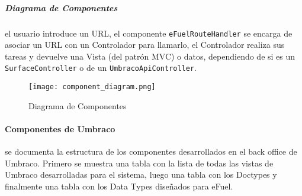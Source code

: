 \subparagraph*{Diagrama de Componentes} el usuario introduce un URL, el componente \texttt{eFuel\-RouteHandler} se encarga de asociar un URL con un Controlador para llamarlo, el Controlador realiza sus tareas y devuelve una Vista (del patrón MVC) o datos, dependiendo de si es un \texttt{SurfaceController} o de un \texttt{UmbracoApiController}.

\begin{figure}[H]
    \texttt{[image: component\_diagram.png]}
    \caption{Diagrama de Componentes}
    \label{fig:component_diagram}
    \centering
\end{figure}

\paragraph{Componentes de Umbraco} se documenta la estructura de los componentes desarrollados en el back office de Umbraco. Primero se muestra una tabla con la lista de todas las vistas de Umbraco desarrolladas para el sistema, luego una tabla con los Doctypes y finalmente una tabla con los Data Types diseñados para eFuel.

